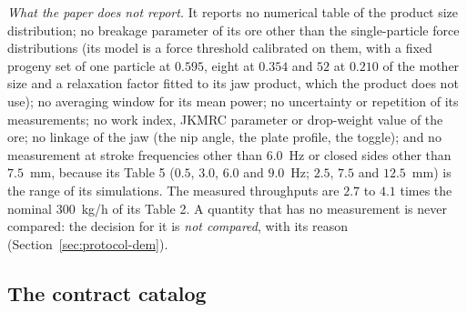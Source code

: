 \begin{table}[!t]
\centering
\caption{Measured values of the laboratory jaw tests of Barrios et al.\ at $6.0$~Hz and a closed side of $7.5$~mm, as the package \texttt{crushdem} digitised them from the paper's Figs.~14a, 14b and 7a (the net power of the $63/52$~mm feed is the paper's text value): the value is the mean of two digitisation passes and the quantity after $\pm$ is their difference, the digitisation noise. The last column is the largest and the root-mean-square difference between the two passes of the product curve on nine sieves. Generated from the installed package.}
\label{tab:lab-measured}
\footnotesize

\end{table}

\emph{What the paper does not report.} It reports no numerical table of the product size distribution; no breakage parameter of its ore other than the single-particle force distributions (its model is a force threshold calibrated on them, with a fixed progeny set of one particle at $0.595$, eight at $0.354$ and $52$ at $0.210$ of the mother size and a relaxation factor fitted to its jaw product, which the product does not use); no averaging window for its mean power; no uncertainty or repetition of its measurements; no work index, JKMRC parameter or drop-weight value of the ore; no linkage of the jaw (the nip angle, the plate profile, the toggle); and no measurement at stroke frequencies other than $6.0$~Hz or closed sides other than $7.5$~mm, because its Table 5 ($0.5$, $3.0$, $6.0$ and $9.0$~Hz; $2.5$, $7.5$ and $12.5$~mm) is the range of its simulations. The measured throughputs are $2.7$ to $4.1$ times the nominal $300$~kg/h of its Table 2. A quantity that has no measurement is never compared: the decision for it is \emph{not compared}, with its reason (Section~\ref{sec:protocol-dem}).

\subsection{The contract catalog}\label{sec:data-catalog}

